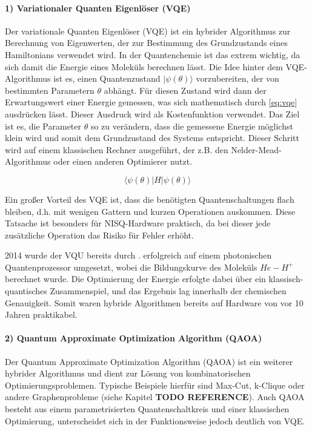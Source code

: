 \paragraph{1) Variationaler Quanten Eigenlöser (VQE)}
\label{nisq-definition}
Der variationale Quanten Eigenlöser (VQE) ist ein hybrider Algorithmus zur Berechnung von Eigenwerten, der zur Bestimmung des Grundzustands eines Hamiltonians verwendet wird. In der Quantenchemie ist das extrem wichtig, da sich damit die Energie eines Moleküls berechnen lässt. Die Idee hinter dem VQE-Algorithmus ist es, einen Quantenzustand $|\psi(\theta)\rangle$ vorzubereiten, der von bestimmten Parametern $\theta$ abhängt. Für diesen Zustand wird dann der Erwartungswert einer Energie gemessen, was sich mathematisch durch \autoref{eq:vqe} ausdrücken lässt. Dieser Ausdruck wird als Kostenfunktion verwendet. Das Ziel ist es, die Parameter $\theta$ so zu verändern, dass die gemessene Energie möglichst klein wird und somit dem Grundzustand des Systems entspricht. Dieser Schritt wird auf einem klassischen Rechner ausgeführt, der z.B. den Nelder-Mead-Algorithmus oder einen anderen Optimierer nutzt. 

\begin{equation}
    \langle\psi(\theta)|H|\psi(\theta)\rangle
\label{eq:vqe}
\end{equation}

Ein großer Vorteil des VQE ist, dass die benötigten Quantenschaltungen flach bleiben, d.h. mit wenigen Gattern und kurzen Operationen auskommen. Diese Tatsache ist besonders für NISQ-Hardware praktisch, da bei dieser jede zusätzliche Operation das Risiko für Fehler erhöht.

2014 wurde der VQU bereits durch \citeauthor{peruzzo_variational_nodate}. erfolgreich auf einem photonischen Quantenprozessor umgesetzt, wobei die Bildungskurve des Moleküls $He-H^+$ berechnet wurde. Die Optimierung der Energie erfolgte dabei über ein klassisch-quantisches Zusammenspiel, und das Ergebnis lag innerhalb der chemischen Genauigkeit. Somit waren hybride Algorithmen bereits auf Hardware von vor 10 Jahren praktikabel. \autocite{cerezo_variational_2022} \autocite{peruzzo_variational_nodate}
\\

\paragraph{2) Quantum Approximate Optimization Algorithm (QAOA)}
Der Quantum Approximate Optimization Algorithm (QAOA) ist ein weiterer hybrider Algorithmus und dient zur Lösung von kombinatorischen Optimierungsproblemen. Typische Beispiele hierfür sind Max-Cut, k-Clique oder andere Graphenprobleme (siehe Kapitel \textbf{TODO REFERENCE}). Auch QAOA besteht aus einem parametrisierten Quantenschaltkreis und einer klassischen Optimierung, unterscheidet sich in der Funktionsweise jedoch deutlich von VQE.

